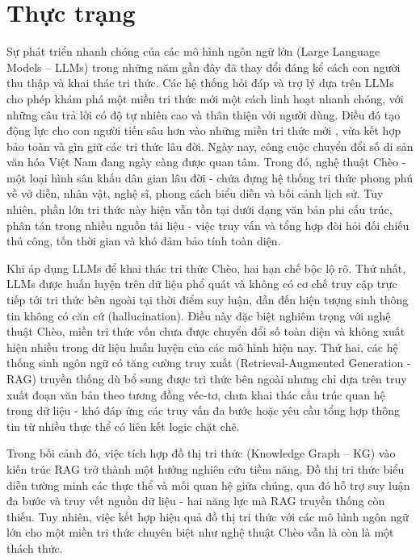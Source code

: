 \section{Thực trạng}

Sự phát triển nhanh chóng của các mô hình ngôn ngữ lớn (Large Language Models – LLMs) trong những năm gần đây đã thay đổi đáng kể cách con người thu thập và khai thác tri thức. Các hệ thống hỏi đáp và trợ lý dựa trên LLMs cho phép khám phá một miền tri thức mới một cách linh hoạt nhanh chóng, với những câu trả lời có độ tự nhiên cao và thân thiện với người dùng. Điều đó tạo động lực cho con người tiến sâu hơn vào những miền tri thức mới , vừa kết hợp bảo toàn và gìn giữ các tri thức lâu đời. Ngày nay, công cuộc chuyển đổi số di sản văn hóa Việt Nam đang ngày càng được quan tâm. Trong đó, nghệ thuật Chèo - một loại hình sân khấu dân gian lâu đời - chứa đựng hệ thống tri thức phong phú về vở diễn, nhân vật, nghệ sĩ, phong cách biểu diễn và bối cảnh lịch sử. Tuy nhiên, phần lớn tri thức này hiện vẫn tồn tại dưới dạng văn bản phi cấu trúc, phân tán trong nhiều nguồn tài liệu - việc truy vấn và tổng hợp đòi hỏi đối chiếu thủ công, tốn thời gian và khó đảm bảo tính toàn diện.

Khi áp dụng LLMs để khai thác tri thức Chèo, hai hạn chế bộc lộ rõ. Thứ nhất, LLMs được huấn luyện trên dữ liệu phổ quát và không có cơ chế truy cập trực tiếp tới tri thức bên ngoài tại thời điểm suy luận, dẫn đến hiện tượng sinh thông tin không có căn cứ (hallucination). Điều này đặc biệt nghiêm trọng với nghệ thuật Chèo, miền tri thức vốn chưa được chuyển đổi số toàn diện và không xuất hiện nhiều trong dữ liệu huấn luyện của các mô hình hiện nay. Thứ hai, các hệ thống sinh ngôn ngữ có tăng cường truy xuất (Retrieval-Augmented Generation - RAG) truyền thống dù bổ sung được tri thức bên ngoài nhưng chỉ dựa trên truy xuất đoạn văn bản theo tương đồng véc-tơ, chưa khai thác cấu trúc quan hệ trong dữ liệu - khó đáp ứng các truy vấn đa bước hoặc yêu cầu tổng hợp thông tin từ nhiều thực thể có liên kết logic chặt chẽ.

Trong bối cảnh đó, việc tích hợp đồ thị tri thức (Knowledge Graph – KG) vào kiến trúc RAG trở thành một hướng nghiên cứu tiềm năng. Đồ thị tri thức biểu diễn tường minh các thực thể và mối quan hệ giữa chúng, qua đó hỗ trợ suy luận đa bước và truy vết nguồn dữ liệu - hai năng lực mà RAG truyền thống còn thiếu. Tuy nhiên, việc kết hợp hiệu quả đồ thị tri thức với các mô hình ngôn ngữ lớn cho một miền tri thức chuyên biệt như nghệ thuật Chèo vẫn là còn là một thách thức.

